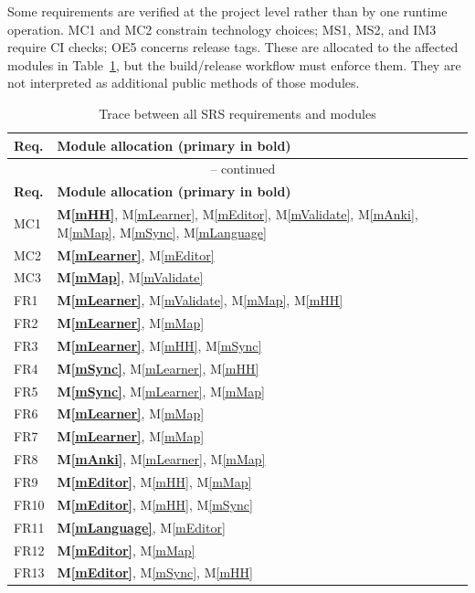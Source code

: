 \documentclass[12pt, titlepage]{article}
\newcommand{\mref}[1]{M\ref{#1}}
\begin{document}
Some requirements are verified at the project level rather than by
one runtime operation. MC1 and MC2 constrain technology choices;
MS1, MS2, and IM3 require CI checks; OE5 concerns release tags.
These are allocated to the affected modules in Table~\ref{TblRT},
but the build/release workflow must enforce them. They are not
interpreted as additional public methods of those modules.

\small
\begin{longtable}{@{}p{}p{}@{}}
\caption{Trace between all SRS requirements and modules}\label{TblRT}\\
\toprule
\textbf{Req.} & \textbf{Module allocation (primary in bold)}\\
\midrule
\endfirsthead
\multicolumn{2}{c}{\tablename\ \thetable{} -- continued}\\
\toprule
\textbf{Req.} & \textbf{Module allocation (primary in bold)}\\
\midrule
\endhead
\bottomrule
\endfoot
MC1 & \textbf{\mref{mHH}}, \mref{mLearner}, \mref{mEditor}, \mref{mValidate}, \mref{mAnki}, \mref{mMap}, \mref{mSync}, \mref{mLanguage}\\
MC2 & \textbf{\mref{mLearner}}, \mref{mEditor}\\
MC3 & \textbf{\mref{mMap}}, \mref{mValidate}\\
FR1 & \textbf{\mref{mLearner}}, \mref{mValidate}, \mref{mMap}, \mref{mHH}\\
FR2 & \textbf{\mref{mLearner}}, \mref{mMap}\\
FR3 & \textbf{\mref{mLearner}}, \mref{mHH}, \mref{mSync}\\
FR4 & \textbf{\mref{mSync}}, \mref{mLearner}, \mref{mHH}\\
FR5 & \textbf{\mref{mSync}}, \mref{mLearner}, \mref{mMap}\\
FR6 & \textbf{\mref{mLearner}}, \mref{mMap}\\
FR7 & \textbf{\mref{mLearner}}, \mref{mMap}\\
FR8 & \textbf{\mref{mAnki}}, \mref{mLearner}, \mref{mMap}\\
FR9 & \textbf{\mref{mEditor}}, \mref{mHH}, \mref{mMap}\\
FR10 & \textbf{\mref{mEditor}}, \mref{mHH}, \mref{mSync}\\
FR11 & \textbf{\mref{mLanguage}}, \mref{mEditor}\\
FR12 & \textbf{\mref{mEditor}}, \mref{mMap}\\
FR13 & \textbf{\mref{mEditor}}, \mref{mSync}, \mref{mHH}\\

\end{longtable}
\end{document}
